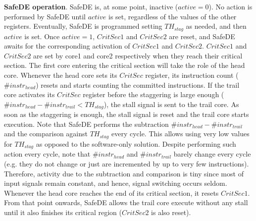 \textbf{SafeDE operation}. SafeDE is, at some point, inactive ($active=0$). No action is performed by SafeDE until $active$ is set, regardless of the values of the other registers. 
Eventually, SafeDE is programmed setting $TH_{stag}$ as needed, and then $active$ is set.
Once $active=1$, $CritSec1$ and $CritSec2$ are reset, and SafeDE awaits for the corresponding activation of $CritSec1$ and $CritSec2$.  
$CritSec1$ and $CritSec2$ are set by core1 and core2 respectively when they reach their critical section. The first core entering the critical section will take the role of the head core. Whenever the head core sets its $CritSec$ register, its instruction count ($\#instr_{head}$) resets and starts counting the committed instructions. If the trail core activates its $CritSec$ register before the staggering is large enough ($\#instr_{head} - \#instr_{trail} < TH_{stag}$), the stall signal is sent to the trail core.
As soon as the staggering is enough, the stall signal is reset and the trail core starts execution. Note that SafeDE performs the subtraction $\#instr_{head} - \#instr_{trail}$ and the comparison against $TH_{stag}$ every cycle. This allows using very low values for $TH_{stag}$ as opposed to the software-only solution. Despite performing such action every cycle, note that $\#instr_{head}$ and $\#instr_{trail}$ barely change every cycle (e.g. they do not change or just are incremented by up to very few instructions). Therefore, activity due to the subtraction and comparison is tiny since most of input signals remain constant, and hence, signal switching occurs seldom.
Whenever the head core reaches the end of its critical section, it resets $CritSec1$. From that point onwards, SafeDE allows the trail core execute without any stall until it also finishes its critical region ($CritSec2$ is also reset).


